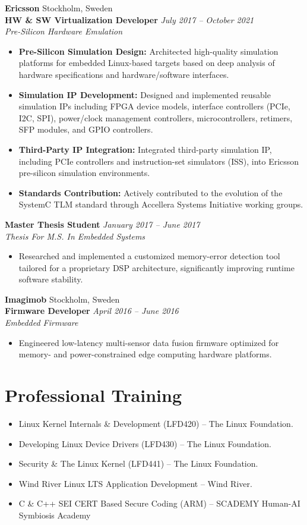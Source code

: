 \documentclass[10pt,a4paper]{article}
\newcommand{\job}[4]{\textbf{#1} \hfill \textit{#2}\\\textit{\color{secondary}#3}\hfill\textit{\color{secondary}#4}\vspace{-2pt}}
\begin{document}
\vspace{5pt}
\newpage
\textbf{Ericsson} \hfill Stockholm, Sweden\\
\job{HW \& SW Virtualization Developer}{July 2017 -- October 2021}{Pre-Silicon Hardware Emulation}{}
\begin{itemize}
\item \textbf{Pre-Silicon Simulation Design:} Architected high-quality simulation platforms for embedded Linux-based targets based on deep analysis of hardware specifications and hardware/software interfaces.
\item \textbf{Simulation IP Development:} Designed and implemented reusable simulation IPs including FPGA device models, interface controllers (PCIe, I2C, SPI), power/clock management controllers, microcontrollers, retimers, SFP modules, and GPIO controllers.
\item \textbf{Third-Party IP Integration:} Integrated third-party simulation IP, including PCIe controllers and instruction-set simulators (ISS), into Ericsson pre-silicon simulation environments.
\item \textbf{Standards Contribution:} Actively contributed to the evolution of the SystemC TLM standard through Accellera Systems Initiative working groups.
\end{itemize}
\vspace{5pt}
\job{Master Thesis Student}{January 2017 -- June 2017}{Thesis For M.S. In Embedded Systems}{}
\begin{itemize}
\item Researched and implemented a customized memory-error detection tool tailored for a proprietary DSP architecture, significantly improving runtime software stability.
\end{itemize}
\vspace{5pt}
\textbf{Imagimob} \hfill Stockholm, Sweden\\
\job{Firmware Developer}{April 2016 -- June 2016}{Embedded Firmware}{}
\begin{itemize}
\item Engineered low-latency multi-sensor data fusion firmware optimized for memory- and power-constrained edge computing hardware platforms.
\end{itemize}
\section{Professional Training}
\begin{itemize}
\item Linux Kernel Internals \& Development (LFD420) -- The Linux Foundation.
\item Developing Linux Device Drivers (LFD430) -- The Linux Foundation.
\item Security \& The Linux Kernel (LFD441) -- The Linux Foundation.
\item Wind River Linux LTS Application Development -- Wind River.
\item C \& C++ SEI CERT Based Secure Coding (ARM) -- SCADEMY Human-AI Symbiosis Academy
\end{itemize}
\end{document}
